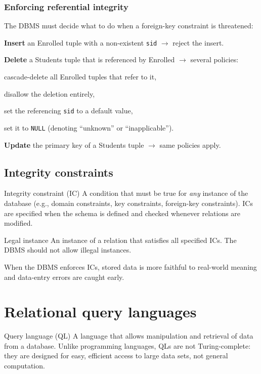 \documentclass[../../dis.tex]{subfiles}
\begin{document}
\subsubsection*{Enforcing referential integrity}
The DBMS must decide what to do when a foreign-key constraint is threatened:
\begin{dashlist}
    \item \textbf{Insert} an Enrolled tuple with a non-existent \texttt{sid} $\rightarrow$ reject the insert.
    \item \textbf{Delete} a Students tuple that is referenced by Enrolled $\rightarrow$ several policies:
    \begin{dashlist}
        \item cascade-delete all Enrolled tuples that refer to it,
        \item disallow the deletion entirely,
        \item set the referencing \texttt{sid} to a default value,
        \item set it to \texttt{NULL} (denoting ``unknown'' or ``inapplicable'').
    \end{dashlist}
    \item \textbf{Update} the primary key of a Students tuple $\rightarrow$ same policies apply.
\end{dashlist}

\subsection{Integrity constraints}

\begin{concept}{Integrity constraint (IC)}
A condition that must be true for \emph{any} instance of the database (e.g., domain constraints, key constraints, foreign-key constraints). ICs are specified when the schema is defined and checked whenever relations are modified.
\end{concept}

\begin{concept}{Legal instance}
An instance of a relation that satisfies all specified ICs. The DBMS should not allow illegal instances.
\end{concept}

When the DBMS enforces ICs, stored data is more faithful to real-world meaning and data-entry errors are caught early.

\newpage
\section{Relational query languages}
\begin{concept}{Query language (QL)}
A language that allows manipulation and retrieval of data from a database. Unlike programming languages, QLs are not Turing-complete: they are designed for easy, efficient access to large data sets, not general computation.
\end{concept}
\end{document}
